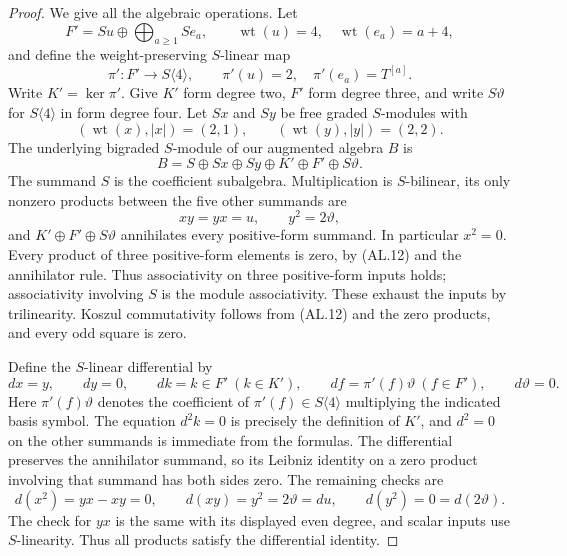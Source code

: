 \begin{proof}
We give all the algebraic operations.  Let
\[
 F' = S u\oplus\bigoplus_{a\geq1}S e_a,\qquad
 \operatorname{wt}(u)=4,\quad
 \operatorname{wt}(e_a)=a+4,
\]
and define the weight-preserving $S$-linear map
\[
 \pi':F'\longrightarrow S\langle4\rangle,\qquad
 \pi'(u)=2,\quad\pi'(e_a)=T^{[a]} .
 \tag{AL.10}
\]
Write $K'=\ker\pi'$.  Give $K'$ form degree two, $F'$
form degree three, and write $S\vartheta$ for
$S\langle4\rangle$ in form degree four.
Let $Sx$ and $Sy$ be free graded $S$-modules with
\[
 ( \operatorname{wt}(x),|x|)=(2,1),\qquad
 ( \operatorname{wt}(y),|y|)=(2,2).
\]
The underlying bigraded $S$-module of our augmented algebra $B$ is
\[
 B=S\oplus Sx\oplus Sy\oplus K'\oplus F'\oplus S\vartheta .
 \tag{AL.11}
\]
The summand $S$ is the coefficient subalgebra.  Multiplication
is $S$-bilinear, its only nonzero products between the five
other summands are
\[
 xy=yx=u,\qquad y^2=2\vartheta ,
 \tag{AL.12}
\]
and $K'\oplus F'\oplus S\vartheta$ annihilates every
positive-form summand.  In particular $x^2=0$.
Every product of three positive-form elements is zero, by
\textup{(AL.12)} and the annihilator rule.  Thus associativity
on three positive-form inputs holds; associativity involving
$S$ is the module associativity.  These exhaust the inputs
by trilinearity.  Koszul commutativity follows from
\textup{(AL.12)} and the zero products, and every odd square
is zero.

Define the $S$-linear differential by
\[
 dx=y,\qquad dy=0,\qquad
 dk=k\in F'\ (k\in K'),\qquad
 df=\pi'(f)\vartheta\ (f\in F'),\qquad d\vartheta=0 .
 \tag{AL.13}
\]
Here $\pi'(f)\vartheta$ denotes the coefficient of
$\pi'(f)\in S\langle4\rangle$ multiplying the indicated
basis symbol.  The equation $d^2k=0$ is precisely the
definition of $K'$, and $d^2=0$ on the other summands is
immediate from the formulas.  The differential preserves
the annihilator summand, so its Leibniz identity on a zero
product involving that summand has both sides zero.
The remaining checks are
\[
 d(x^2)=yx-xy=0,\qquad
 d(xy)=y^2=2\vartheta=du,\qquad
 d(y^2)=0=d(2\vartheta).
 \tag{AL.14}
\]
The check for $yx$ is the same with its displayed even
degree, and scalar inputs use $S$-linearity.  Thus all
products satisfy the differential identity.


\end{proof}
